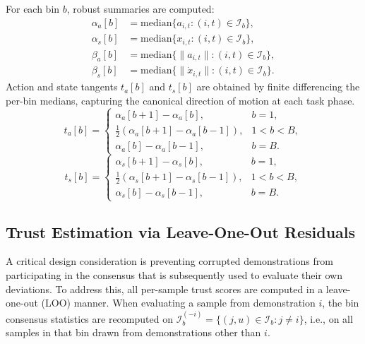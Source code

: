 \documentclass[a4paper, 10pt, conference]{ieeeconf}
\begin{document}
For each bin $b$, robust summaries are computed:
\begin{align}
    \alpha_a[b] & = \mathrm{median}\{a_{i,t} : (i,t)\in\mathcal{I}_b\}, \\
    \alpha_s[b] & = \mathrm{median}\{x_{i,t} : (i,t)\in\mathcal{I}_b\}, \\
    \beta_a[b]  & = \mathrm{median}\{\|a_{i,t}\| : (i,t)\in\mathcal{I}_b\}, \\
    \beta_s[b]  & = \mathrm{median}\{\|\dot{x}_{i,t}\| : (i,t)\in\mathcal{I}_b\}.
\end{align}
Action and state tangents $t_a[b]$ and $t_s[b]$ are obtained by finite differencing the per-bin medians, capturing the canonical direction of motion at each task phase.
\begin{equation}
    t_a[b] =
    \begin{cases}
        \alpha_a[b+1] - \alpha_a[b], & b = 1, \\
        \frac{1}{2}\left(\alpha_a[b+1] - \alpha_a[b-1]\right), & 1 < b < B, \\
        \alpha_a[b] - \alpha_a[b-1], & b = B.
    \end{cases}
\end{equation}
\begin{equation}
    t_s[b] =
    \begin{cases}
        \alpha_s[b+1] - \alpha_s[b], & b = 1, \\
        \frac{1}{2}\left(\alpha_s[b+1] - \alpha_s[b-1]\right), & 1 < b < B, \\
        \alpha_s[b] - \alpha_s[b-1], & b = B.
    \end{cases}
\end{equation}

\subsection{Trust Estimation via Leave-One-Out Residuals}

A critical design consideration is preventing corrupted demonstrations from participating in the consensus that is subsequently used to evaluate their own deviations.
To address this, all per-sample trust scores are computed in a leave-one-out (LOO) manner.
When evaluating a sample from demonstration $i$, the bin consensus statistics are recomputed on $\mathcal{I}_b^{(-i)} = \{(j,u)\in\mathcal{I}_b : j\neq i\}$, i.e., on all samples in that bin drawn from demonstrations other than $i$.
\end{document}

